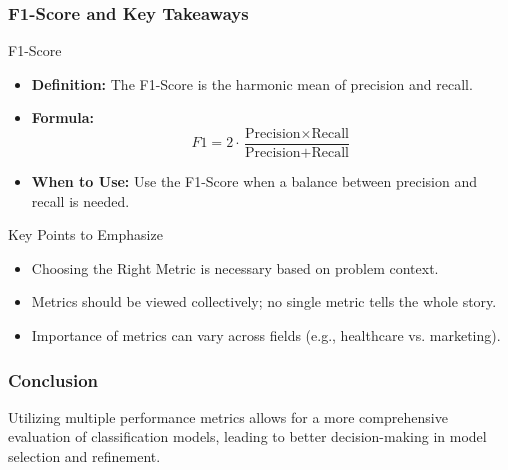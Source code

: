 \documentclass[aspectratio=169]{beamer}
\begin{document}
\begin{frame}[fragile]
    \frametitle{F1-Score and Key Takeaways}
    \begin{block}{F1-Score}
        \begin{itemize}
            \item \textbf{Definition:} The F1-Score is the harmonic mean of precision and recall.
            \item \textbf{Formula:}
            \begin{equation}
                F1 = 2 \cdot \frac{\text{Precision} \times \text{Recall}}{\text{Precision} + \text{Recall}}
            \end{equation}
            \item \textbf{When to Use:} Use the F1-Score when a balance between precision and recall is needed.
        \end{itemize}
    \end{block}

    \begin{block}{Key Points to Emphasize}
        \begin{itemize}
            \item Choosing the Right Metric is necessary based on problem context.
            \item Metrics should be viewed collectively; no single metric tells the whole story.
            \item Importance of metrics can vary across fields (e.g., healthcare vs. marketing).
        \end{itemize}
    \end{block}
\end{frame}

\begin{frame}[fragile]
    \frametitle{Conclusion}
    Utilizing multiple performance metrics allows for a more comprehensive evaluation of classification models, leading to better decision-making in model selection and refinement.
\end{frame}
\end{document}
